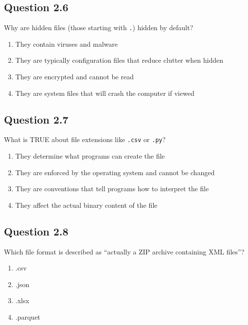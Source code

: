 \documentclass[
  letterpaper,
  DIV=11,
  numbers=noendperiod]{scrreprt}
\providecommand{\tightlist}{%
  \setlength{\itemsep}{0pt}\setlength{\parskip}{0pt}}
\begin{document}
\subsection{Question 2.6}\label{question-2.6}

Why are hidden files (those starting with \texttt{.}) hidden by default?

\begin{enumerate}
\def\labelenumi{\Alph{enumi})}
\tightlist
\item
  They contain viruses and malware\\
\item
  They are typically configuration files that reduce clutter when
  hidden\\
\item
  They are encrypted and cannot be read\\
\item
  They are system files that will crash the computer if viewed
\end{enumerate}

\subsection{Question 2.7}\label{question-2.7}

What is TRUE about file extensions like \texttt{.csv} or \texttt{.py}?

\begin{enumerate}
\def\labelenumi{\Alph{enumi})}
\tightlist
\item
  They determine what programs can create the file\\
\item
  They are enforced by the operating system and cannot be changed\\
\item
  They are conventions that tell programs how to interpret the file\\
\item
  They affect the actual binary content of the file
\end{enumerate}

\subsection{Question 2.8}\label{question-2.8}

Which file format is described as ``actually a ZIP archive containing
XML files''?

\begin{enumerate}
\def\labelenumi{\Alph{enumi})}
\tightlist
\item
  .csv\\
\item
  .json\\
\item
  .xlsx\\
\item
  .parquet
\end{enumerate}
\end{document}
